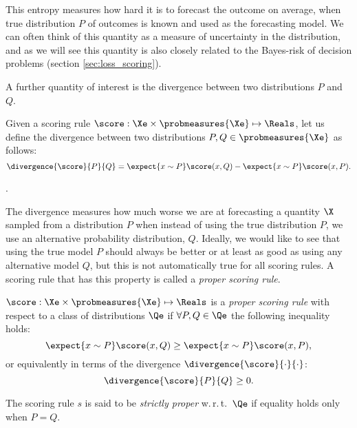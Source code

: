 This entropy measures how hard it is to forecast the outcome on average, when true distribution $P$ of outcomes is known and used as the forecasting model. We can often think of this quantity as a measure of uncertainty in the distribution, and as we will see this quantity is also closely related to the Bayes-risk of decision problems (section \ref{sec:loss_scoring}).

A further quantity of interest is the divergence between two distributions $P$ and $Q$.

\begin{definition}
Given a scoring rule $\score:\Xe\times\probmeasures{\Xe}\mapsto\Reals$, let us define the divergence between two distributions $P,Q\in\probmeasures{\Xe}$ as follows:
	\begin{equation}
		\divergence{\score}{P}{Q} = \expect{x\sim P} \score(x,Q) - \expect{x\sim P} \score(x,P)\mbox{.}\label{eqn:def_divergence}
	\end{equation}
\end{definition}

.

The divergence measures how much worse we are at forecasting a quantity $\X$ sampled from a distribution $P$ when instead of using the true distribution $P$, we use an alternative probability distribution, $Q$. Ideally, we would like to see that using the true model $P$ should always be better or at least as good as using any alternative model $Q$, but this is not automatically true for all scoring rules. A scoring rule that has this property is called a \emph{proper scoring rule}.

\begin{definition}
	$\score:\Xe\times\probmeasures{\Xe}\mapsto\Reals$ is a \emph{proper scoring rule} with respect to a class of distributions $\Qe$ if $\forall P,Q\in\Qe$ the following inequality holds:
	\begin{equation}
		\expect{x\sim P} \score(x,Q) \geq \expect{x\sim P} \score(x,P),
	\end{equation}
	or equivalently in terms of the divergence $\divergence{\score}{\cdot}{\cdot}$:
	\begin{equation}
		\divergence{\score}{P}{Q} \geq 0.
	\end{equation}
	
	The scoring rule $s$ is said to be \emph{strictly proper} w.\,r.\,t.\ $\Qe$ if equality holds only when $P=Q$.
\end{definition}

